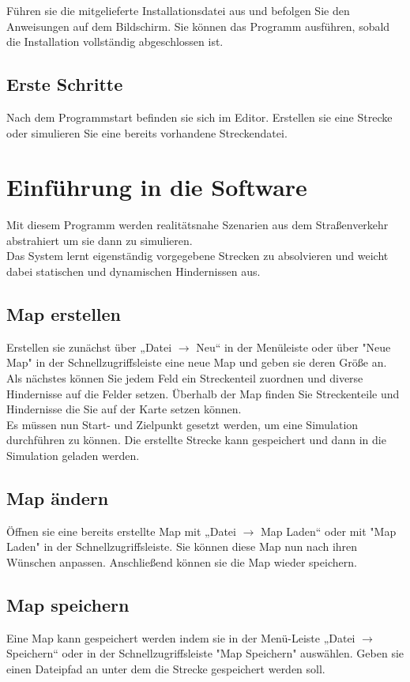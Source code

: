 \documentclass[11pt,a4paper]{article}
\begin{document}
Führen sie die mitgelieferte Installationsdatei aus und befolgen Sie den Anweisungen auf dem Bildschirm. Sie können das Programm ausführen, sobald die Installation vollständig abgeschlossen ist.

\subsection{Erste Schritte}

Nach dem Programmstart befinden sie sich im Editor. Erstellen sie eine Strecke oder simulieren Sie eine bereits vorhandene Streckendatei.

\newpage
\section{Einführung in die Software}
Mit diesem Programm werden realitätsnahe Szenarien aus dem Straßenverkehr abstrahiert um sie dann zu simulieren. \\
Das System lernt eigenständig vorgegebene Strecken zu absolvieren und weicht dabei statischen und dynamischen Hindernissen aus.

\subsection{Map erstellen}
Erstellen sie zunächst über „Datei $\rightarrow$ Neu“ in der Menüleiste oder über "Neue Map" in der Schnellzugriffsleiste eine neue Map und geben sie deren Größe an. \\
Als nächstes können Sie jedem Feld ein Streckenteil zuordnen und diverse Hindernisse auf die Felder setzen.
Überhalb der Map finden Sie Streckenteile und Hindernisse die Sie auf der Karte setzen können.\\
Es müssen nun Start- und Zielpunkt gesetzt werden, um eine Simulation durchführen zu können. Die erstellte Strecke kann gespeichert und dann in die Simulation geladen werden. \\

\subsection{Map ändern}
Öffnen sie eine bereits erstellte Map mit „Datei $\rightarrow$ Map Laden“ oder mit "Map Laden" in der Schnellzugriffsleiste. Sie können diese Map nun nach ihren Wünschen anpassen. 
Anschließend können sie die Map wieder speichern.
\newpage
\subsection{Map speichern}
Eine Map kann gespeichert werden indem sie in der Menü-Leiste „Datei $\rightarrow$ Speichern“ oder in der Schnellzugriffsleiste "Map Speichern" auswählen. Geben sie einen Dateipfad an unter dem die Strecke gespeichert werden soll.
\end{document}
